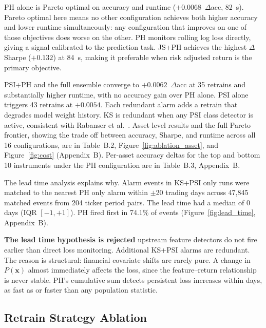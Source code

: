PH alone is Pareto optimal on accuracy and runtime ($+0.0068$~$\Delta$acc, 82~s). Pareto optimal here means no other configuration achieves both higher accuracy and lower runtime simultaneously: any configuration that improves on one of those objectives does worse on the other. PH monitors rolling log loss directly, giving a signal calibrated to the prediction task. JS+PH achieves the highest $\Delta$Sharpe ($+0.132$) at 84~s, making it preferable when risk adjusted return is the primary objective.

PSI+PH and the full ensemble converge to $+0.0062$~$\Delta$acc at 35 retrains and substantially higher runtime, with no accuracy gain over PH alone. PSI alone triggers 43 retrains at $+0.0054$. Each redundant alarm adds a retrain that degrades model weight history. KS is redundant when any PSI class detector is active, consistent with Rabanser et al.~\cite{rabanser2019}. Asset level results and the full Pareto frontier, showing the trade off between accuracy, Sharpe, and runtime across all 16 configurations, are in Table~B.2, Figure~\ref{fig:ablation_asset}, and Figure~\ref{fig:cost} (Appendix~B). Per-asset accuracy deltas for the top and bottom 10 instruments under the PH configuration are in Table~B.3, Appendix~B.

The lead time analysis explains why. Alarm events in KS+PSI only runs were matched to the nearest PH only alarm within $\pm$20 trading days across 47,845 matched events from 204 ticker period pairs. The lead time had a median of 0 days (IQR $[-1, +1]$). PH fired first in 74.1\% of events (Figure~\ref{fig:lead_time}, Appendix~B).

\textbf {The lead time hypothesis is rejected} upstream feature detectors do not fire earlier than direct loss monitoring. Additional KS+PSI alarms are redundant. The reason is structural: financial covariate shifts are rarely pure. A change in $P(\mathbf{x})$ almost immediately affects the loss, since the feature--return relationship is never stable. PH's cumulative sum detects persistent loss increases within days, as fast as or faster than any population statistic.

\subsection{Retrain Strategy Ablation}

